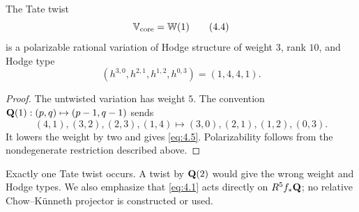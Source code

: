 \begin{theorem}
\label{thm:vhs}
The Tate twist
\[
 \mathbb V_{\mathrm{core}}=\mathbb W(1)                               \tag{4.4}
\]
is a polarizable rational variation of Hodge structure of weight \(3\),
rank \(10\), and Hodge type
\[
 (h^{3,0},h^{2,1},h^{1,2},h^{0,3})=(1,4,4,1).
 \tag{4.5}
\label{eq:4.5}
\]
\end{theorem}

\begin{proof}
The untwisted variation has weight \(5\).  The convention
\(\mathbf Q(1):(p,q)\mapsto(p-1,q-1)\) sends
\[
 (4,1),(3,2),(2,3),(1,4)
 \longmapsto(3,0),(2,1),(1,2),(0,3).
\]
It lowers the weight by two and gives \cref{eq:4.5}.  Polarizability follows
from the nondegenerate restriction described above.
\end{proof}

Exactly one Tate twist occurs.  A twist by \(\mathbf Q(2)\) would give the wrong
weight and Hodge types.  We also emphasize that \cref{eq:4.1} acts directly
on \(R^5f_*\mathbf Q\); no relative Chow--K\"unneth projector is constructed or
used.
